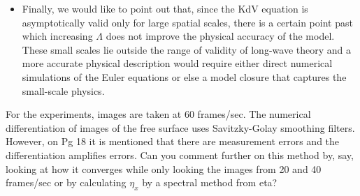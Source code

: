 \documentclass[11pt]{article}
\newcommand{\comment}[1]{{\color{blue} #1}}
\begin{document}
\begin{itemize}
\item Finally, we would like to point out that, since the KdV equation is asymptotically valid only for large spatial scales, there is a certain point past which increasing $\Lambda$ does not improve the physical accuracy of the model. These small scales lie outside the range of validity of long-wave theory and a more accurate physical description would require either direct numerical simulations of the Euler equations or else a model closure that captures the small-scale physics.
\end{itemize}

\noindent
\comment{For the experiments, images are taken at 60 frames/sec. The numerical differentiation of images of the free surface uses Savitzky-Golay smoothing filters. However, on Pg 18 it is mentioned that there are measurement errors and the differentiation amplifies errors. Can you comment further on this method by, say, looking at how it converges while only looking the images from 20 and 40 frames/sec or by calculating $\eta_x$ by a spectral method from eta? }
\end{document}
